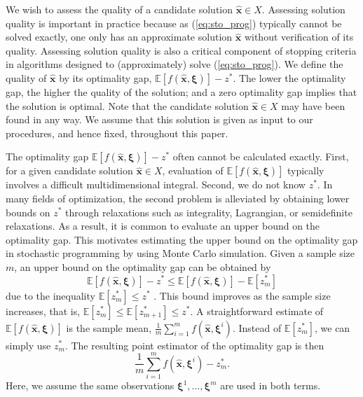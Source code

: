 \documentclass[12pt]{article}
\newcommand{\e}[1]{\mathbb{E} \left[ #1 \right]
}
\newcommand{\x}{\mathbf{x}}
\newcommand{\xh}{{\hat{\x}}}
\newcommand{\xit}{\boldsymbol{\xi}}
\newcommand{\xiti}{\xit^i}
\newcommand{\zs}{z^*}
\begin{document}
We wish to assess the quality of a candidate solution $\xh \in X$. 
Assessing solution quality is important in practice because as (\ref{eq:sto_prog}) typically cannot be solved exactly, one only has an approximate solution $\xh$ without verification of its quality.
Assessing solution quality is also a critical component of stopping criteria in algorithms designed to (approximately) solve (\ref{eq:sto_prog}).
We define the quality of $\xh$ by its optimality gap, $\e{f(\xh,\xit)} - \zs$. 
The lower the optimality gap, the higher the quality of the solution; and a zero optimality gap implies that the solution is optimal. 
Note that the candidate solution $\xh \in X$ may have been found in any way. 
We assume that this solution is given as input to our procedures, and hence fixed, throughout this paper. 


The optimality gap $\e{f(\xh,\xit)} - \zs$ often cannot be calculated exactly. First, for a given candidate solution $\xh \in X$, evaluation of $\e{f(\xh,\xit)}$ typically involves a difficult multidimensional integral. 
Second, we do not know $\zs$. 
In many fields of optimization, the second problem is alleviated by obtaining lower bounds on $\zs$ through relaxations such as integrality, Lagrangian, or semidefinite relaxations.
As a result, it is common to evaluate an upper bound on the optimality gap. 
This motivates estimating the upper bound on the optimality gap in stochastic programming by using Monte Carlo simulation.
Given a sample size $m$, an upper bound on the optimality gap can be obtained by $$
\e{f(\xh,\xit)} - \zs \leq \e{f(\xh,\xit)} - \e{\zs_m}
$$ 
due to the inequality $\e{\zs_m} \leq \zs$ \citep{Mak1999,norkin_pflug_ruszczynski_98}.
This bound improves as the sample size increases, that is, $\e{\zs_m} \leq \e{\zs_{m+1}} \leq \zs$.  
A straightforward estimate of $\e{f(\xh,\xit)}$ is the sample mean, $\frac{1}{m} \sum_{i=1}^m f(\xh,\xiti)$. 
Instead of $\e{\zs_m}$, we can simply use $\zs_m$.  
The resulting point estimator of the optimality gap is then 
$$
\frac{1}{m} \sum_{i=1}^m f(\xh,\xiti) - \zs_m.
$$ 
Here, we assume the same observations $\xit^1, \dots, \xit^m$ are used in both terms.  
\end{document}
